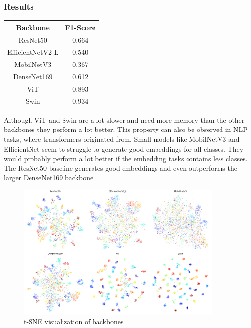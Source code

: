 \documentclass[12pt,a4paper]{report}
\begin{document}
\subsubsection{Results}
\begin{table}
	\begin{tabular}{ | c | c | }
		\hline
		Backbone & F1-Score \\ 
		\hline
		ResNet50 & 0.664 \\ 
		\hline
		EfficientNetV2 L & 0.540 \\ 
		\hline
		MobilNetV3 & 0.367 \\ 
		\hline
		DenseNet169 & 0.612 \\ 
		\hline
		ViT & 0.893 \\ 
		\hline
		Swin & 0.934 \\ 
		\hline
	\end{tabular}
\end{table} 
Although ViT and Swin are a lot slower and need more memory than the other backbones they perform a lot better.
This property can also be observed in NLP tasks, where transformers originated from.
Small models like MobilNetV3 and EfficientNet seem to struggle to generate good embeddings for all classes.
They would probably perform a lot better if the embedding tasks contains less classes.
The ResNet50 baseline generates good embeddings and even outperforms the larger DenseNet169 backbone.



\begin{figure}[hb]
	\centering
	\includegraphics[width=0.9\textwidth]{../plots/backbones.png}
	\caption{t-SNE visualization of backbones}
\end{figure}

\newpage
\end{document}
